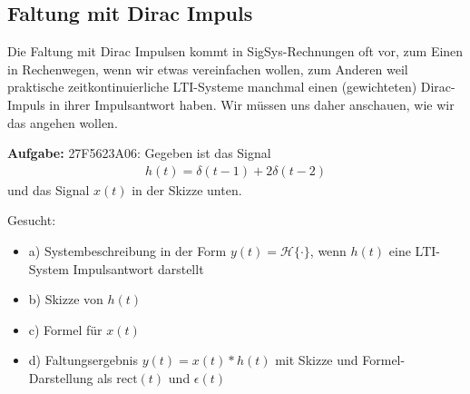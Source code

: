 \newpage
\subsection{Faltung mit Dirac Impuls}
\label{sec:27F5623A06}
\begin{Ziel}
Die Faltung mit Dirac Impulsen kommt in SigSys-Rechnungen oft vor, zum Einen
in Rechenwegen, wenn wir etwas vereinfachen wollen, zum Anderen weil praktische
zeitkontinuierliche LTI-Systeme manchmal einen (gewichteten) Dirac-Impuls
in ihrer Impulsantwort haben.
%
Wir müssen uns daher anschauen, wie wir das angehen wollen.
\end{Ziel}
\textbf{Aufgabe:}  {\tiny 27F5623A06}: Gegeben ist das Signal
\begin{align*}
h(t) = \delta(t-1) + 2\delta(t-2)
\end{align*}
und das Signal $x(t)$ in der Skizze unten.
\begin{figure}[h!]
\centering
\begin{subfigure}{0.4\textwidth}
\end{subfigure}
\end{figure}

Gesucht:
\begin{itemize}
\setlength\itemsep{-0.5em}
\item a) Systembeschreibung in der Form $y(t) = \mathcal{H}\{\cdot\}$, wenn $h(t)$ eine LTI-System Impulsantwort darstellt
\item b) Skizze von $h(t)$
\item c) Formel für $x(t)$
\item d) Faltungsergebnis $y(t) = x(t) \ast h(t)$ mit Skizze und Formel-Darstellung als $\text{rect}(t)$ und $\epsilon(t)$
\end{itemize}



